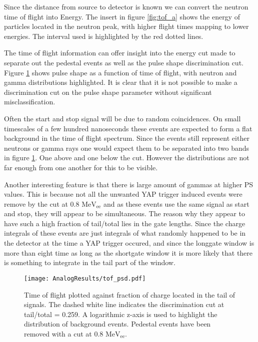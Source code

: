 \documentclass[main.tex]{subfiles}
\begin{document}
Since the distance from source to detector is known we can convert the neutron time of flight into Energy. The insert in figure \ref{fig:tof_a} shows the energy of particles located in the neutron peak, with higher flight times mapping to lower energies. The interval used is highlighted by the red dotted lines.


The time of flight information can offer insight into the energy cut made to separate out the pedestal events as well as the pulse shape discrimination cut. Figure \ref{fig:tof_ps_a} shows pulse shape as a function of time of flight, with neutron and gamma distributions highlighted. It is clear that it is not possible to make a discrimination cut on the pulse shape parameter without significant misclassification. 

Often the start and stop signal will be due to random coincidences. On small timescales of a few hundred nanoseconds these events are expected to form a flat background in the time of flight spectrum. Since the events still represent either neutrons or gamma rays one would expect them to be separated into two bands in figure \ref{fig:tof_ps_a}. One above and one below the cut. However the distributions are not far enough from one another for this to be visible.

Another interesting feature is that there is large amount of gammas at higher PS values. This is because not all the unwanted YAP trigger induced events were remove by the cut at 0.8 $\text{MeV}_\text{ee}$ and as these events use the same signal as start and stop, they will appear to be simultaneous. The reason why they appear to have such a high fraction of tail/total lies in the gate lengths. Since the charge integrals of these events are just integrals of what randomly happened to be in the detector at the time a YAP trigger occured, and since the longgate window is more than eight time as long as the shortgate window it is more likely that there is something to integrate in the tail part of the window.
\begin{figure}[ht]
    \centering
        \texttt{[image: AnalogResults/tof\_psd.pdf]}
        \caption{Time of flight plotted against fraction of charge located in the tail of signals. The dashed white line indicates the discrimination cut at tail/total = 0.259. A logarithmic z-axis is used to highlight the distribution of background events. Pedestal events have been removed with a cut at 0.8 $\text{MeV}_\text{ee}$.}
    \label{fig:tof_ps_a} 
\end{figure}
\end{document}
